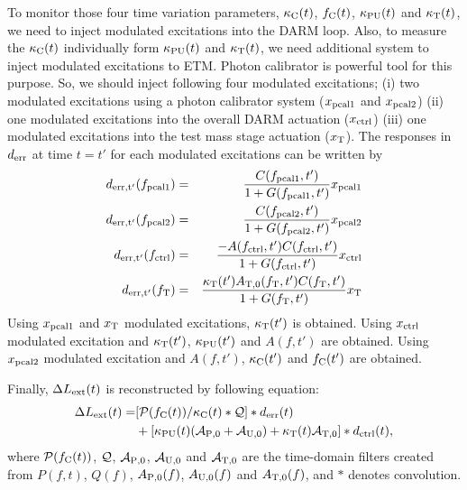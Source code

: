 To monitor those four time variation parameters, 
$\kappa_{\rm C}(t)$, $f_{\rm C}(t)$, $\kappa_{\rm PU}(t)$ and $\kappa_{\rm T}(t)$, 
we need to inject modulated excitations into the DARM loop.
Also, to measure the $\kappa_{\rm C}(t)$ individually form $\kappa_{\rm PU}(t)$ and $\kappa_{\rm T}(t)$,
we need additional system to inject modulated excitations to ETM.
Photon calibrator is powerful tool for this purpose.
So, we should inject following four modulated excitations;
(i) two modulated excitations using a photon calibrator system ($x_{\rm pcal1}$ and $x_{\rm pcal2}$)
(ii) one modulated excitations into the overall DARM actuation ($x_{\rm ctrl}$)
(iii) one modulated excitations into the test mass stage actuation ($x_{\rm T}$).
The responses in $d_{\rm err}$ at time $t=t'$ for each modulated excitations can be written by
\begin{eqnarray}
d_{\rm err, t'}(f_{\rm pcal1}) &=& \frac{C(f_{\rm pcal1},t')}{1+G(f_{\rm pcal1},t')} x_{\rm pcal1} \\
d_{\rm err, t'}(f_{\rm pcal2}) &=& \frac{C(f_{\rm pcal2},t')}{1+G(f_{\rm pcal2},t')} x_{\rm pcal2} \\
d_{\rm err, t'}(f_{\rm ctrl}) &=& \frac{-A(f_{\rm ctrl}, t')C(f_{\rm ctrl},t')}{1+G(f_{\rm ctrl},t')} x_{\rm ctrl}  \\
d_{\rm err, t'}(f_{\rm T}) &=& \frac{\kappa_{\rm T}(t') A_{\rm T,0}(f_{\rm T}, t')C(f_{\rm T},t')}{1+G(f_{\rm T},t')} x_{\rm T} 
\end{eqnarray}
Using $x_{\rm pcal1}$ and $x_{\rm T}$ modulated excitations, $\kappa_{\rm T}(t')$ is obtained.
Using $x_{\rm ctrl}$ modulated excitation and $\kappa_{\rm T}(t')$, $\kappa_{\rm PU}(t')$ and $A(f,t')$ are obtained. 
Using $x_{\rm pcal2}$ modulated excitation and $A(f,t')$, $\kappa_{\rm C}(t')$ and $f_{\rm C}(t')$ are obtained.

Finally, $\Delta L_{\rm ext}(t)$ is reconstructed by following equation:
\begin{eqnarray}
\Delta L_{\rm ext}(t) = &[{\cal P}(f_{\rm C}(t))/ \kappa_{\rm C}(t) * {\cal Q} ] * d_{\rm err}(t) \nonumber \\
& + [ 
  \kappa_{\rm PU}(t)({\cal A}_{\rm P,0} + {\cal A}_{\rm U,0}) + \kappa_{\rm T}(t) {\cal A}_{\rm T,0}  
]
* d_{\rm ctrl}(t),
\end{eqnarray}
where ${\cal P}(f_{\rm C}(t))$, ${\cal Q}$, ${\cal A_{\rm P,0}}$, ${\cal A_{\rm U,0}}$ and ${\cal A_{\rm T,0}}$  
are the time-domain filters created from $P(f,t)$, $Q(f)$, $A_{\rm P,0}(f)$, $A_{\rm U,0}(f)$ and $A_{\rm T,0}(f)$, and $*$ denotes convolution.

